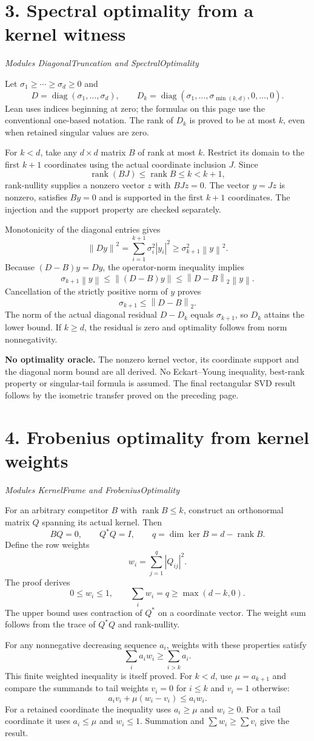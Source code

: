 \documentclass[11pt]{article}
\newcommand{\norm}[1]{\left\lVert#1\right\rVert}
\newcommand{\rank}{\operatorname{rank}}
\newcommand{\diag}{\operatorname{diag}}
\newcommand{\pageheading}[2]{\section*{\color{ink}#1}\textit{#2}\par}
\begin{document}
\newpage
\pageheading{3. Spectral optimality from a kernel witness}{Modules DiagonalTruncation and SpectralOptimality}
Let $\sigma_1\geq\cdots\geq\sigma_d\geq0$ and
\[
D=\diag(\sigma_1,\ldots,\sigma_d),\qquad
D_k=\diag(\sigma_1,\ldots,\sigma_{\min(k,d)},0,\ldots,0).
\]
Lean uses indices beginning at zero; the formulas on this page use the conventional one-based notation. The rank of $D_k$ is proved to be at most $k$, even when retained singular values are zero.

For $k<d$, take any $d\times d$ matrix $B$ of rank at most $k$. Restrict its domain to the first $k+1$ coordinates using the actual coordinate inclusion $J$. Since
\[
\rank(BJ)\leq\rank B\leq k<k+1,
\]
rank-nullity supplies a nonzero vector $z$ with $BJz=0$. The vector $y=Jz$ is nonzero, satisfies $By=0$ and is supported in the first $k+1$ coordinates. The injection and the support property are checked separately.

Monotonicity of the diagonal entries gives
\[
\norm{Dy}^{2}
=\sum_{i=1}^{k+1}\sigma_i^{2}|y_i|^{2}
\geq\sigma_{k+1}^{2}\norm y^{2}.
\]
Because $(D-B)y=Dy$, the operator-norm inequality implies
\[
\sigma_{k+1}\norm y
\leq\norm{(D-B)y}
\leq\norm{D-B}_2\norm y.
\]
Cancellation of the strictly positive norm of $y$ proves
\[
\boxed{\sigma_{k+1}\leq\norm{D-B}_2.}
\]
The norm of the actual diagonal residual $D-D_k$ equals $\sigma_{k+1}$, so $D_k$ attains the lower bound. If $k\geq d$, the residual is zero and optimality follows from norm nonnegativity.

\textbf{No optimality oracle.} The nonzero kernel vector, its coordinate support and the diagonal norm bound are all derived. No Eckart--Young inequality, best-rank property or singular-tail formula is assumed. The final rectangular SVD result follows by the isometric transfer proved on the preceding page.

\newpage
\pageheading{4. Frobenius optimality from kernel weights}{Modules KernelFrame and FrobeniusOptimality}
For an arbitrary competitor $B$ with $\rank B\leq k$, construct an orthonormal matrix $Q$ spanning its actual kernel. Then
\[
BQ=0,\qquad Q^*Q=I,\qquad q=\dim\ker B=d-\rank B.
\]
Define the row weights
\[
w_i=\sum_{j=1}^{q}|Q_{ij}|^2.
\]
The proof derives
\[
\boxed{0\leq w_i\leq1,\qquad \sum_iw_i=q\geq\max(d-k,0).}
\]
The upper bound uses contraction of $Q^*$ on a coordinate vector. The weight sum follows from the trace of $Q^*Q$ and rank-nullity.

For any nonnegative decreasing sequence $a_i$, weights with these properties satisfy
\[
\sum_i a_iw_i\geq\sum_{i>k}a_i.
\]
This finite weighted inequality is itself proved. For $k<d$, use $\mu=a_{k+1}$ and compare the summands to tail weights $v_i=0$ for $i\leq k$ and $v_i=1$ otherwise:
\[
a_iv_i+\mu(w_i-v_i)\leq a_iw_i.
\]
For a retained coordinate the inequality uses $a_i\geq\mu$ and $w_i\geq0$. For a tail coordinate it uses $a_i\leq\mu$ and $w_i\leq1$. Summation and $\sum w_i\geq\sum v_i$ give the result.
\end{document}
